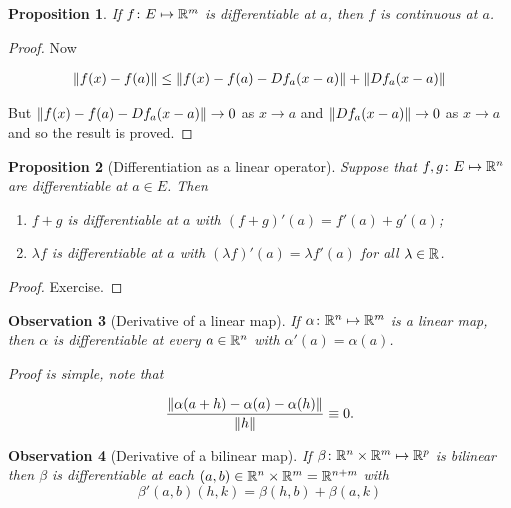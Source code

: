 \documentclass{notes}
\theoremstyle{plain}
\newtheorem{proposition}{Proposition}[chapter]
\newtheorem{observation}[proposition]{Observation}
\begin{document}
\begin{proposition}
If $ f\colon E \mapsto \mathbb{R}^{m} $ is differentiable at $ a $, then
$ f $ is continuous at $ a $.
\end{proposition}


\begin{proof}
Now

\begin{align*}
\left\|f(x) - f(a)\right\| &\le \left\|f(x) - f(a) - Df_a (x-a)\right\|
+ \left\|Df_a(x-a)\right\| \\
\end{align*}

But $ \left\|f(x)-f(a)-Df_a(x-a)\right\| \to 0 $ as $ x \to a $ and
 $ \left\|Df_a(x-a)\right\| \to 0 $ as $ x \to a$ and so the result is proved.
\end{proof}

\begin{proposition}[Differentiation as a linear operator]

Suppose that $ f,g\colon E \mapsto \mathbb{R}^{n} $ are differentiable at $ 
a \in E $. Then
\begin{enumerate}
\item $ f+g $ is differentiable at $ a $ with 
$ (f+g)'(a)=f'(a)+g'(a) $;
\item $ \lambda f $ is differentiable at $ a $ with $ (\lambda 
f)'(a) = \lambda f'(a) $ for all $ \lambda \in \mathbb{R} $.
\end{enumerate}

\end{proposition}

\begin{proof}
Exercise.
\end{proof}

\begin{observation}[Derivative of a linear map]
If $ \alpha\colon  \mathbb{R}^{n}\mapsto \mathbb{R}^{m} $ is a linear map, then $ 
\alpha  $ is differentiable at every $ a \in \mathbb{R}^{n} $ with $ 
\alpha'(a)=\alpha(a) $.

Proof is simple, note that

\[
\frac{ \left\|\alpha(a+h)-\alpha(a)-\alpha(h)\right\|}{\left\|h\right\|} \equiv 0.
\]
\end{observation}


\begin{observation}[Derivative of a bilinear map]
If $\beta\colon \mathbb{R}^{n}\times \mathbb{R}^{m} \mapsto \mathbb{R}^{p}$ is bilinear 
then $ \beta $ is differentiable at each $ (a,b)\in \mathbb{R}^{n}\times 
\mathbb{R}^{m}=\mathbb{R}^{n+m} $ with
\[ \beta'(a,b)(h,k) = \beta(h,b)+\beta(a,k) \]
\end{observation}
\end{document}
